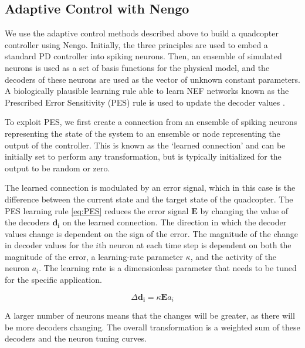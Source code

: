 \documentclass[letterpaper, 10 pt, conference]{ieeeconf}  %
\begin{document}
\subsection{Adaptive Control with Nengo}

We use the adaptive control methods described above to build a quadcopter controller using Nengo.
Initially, the three principles are used to embed a standard PD controller into spiking neurons.
Then, an ensemble of simulated neurons is used as a set of basis functions for the physical model, and the decoders of these neurons are used as the vector of unknown constant parameters.
A biologically plausible learning rule able to learn NEF networks known as the Prescribed Error Sensitivity (PES) rule is used to update the decoder values \cite{bekolay2013simultaneous}. 

To exploit PES, we first create a connection from an ensemble of spiking neurons representing the state of the system to an ensemble or node representing the output of the controller. 
This is known as the `learned connection' and can be initially set to perform any transformation, but is typically initialized for the output to be random or zero.

The learned connection is modulated by an error signal, which in this case is the difference between the current state and the target state of the quadcopter.
The PES learning rule \eqref{eq:PES} reduces the error signal $\bm{E}$ by changing the value of the decoders $\bm{d_{i}}$ on the learned connection. 
The direction in which the decoder values change is dependent on the sign of the error. 
The magnitude of the change in decoder values for the $i$th neuron at each time step is dependent on both the magnitude of the error, a learning-rate parameter $\kappa$, and the activity of the neuron $a_{i}$. 
The learning rate is a dimensionless parameter that needs to be tuned for the specific application. 

\begin{equation} \label{eq:PES}
\Delta \bm{d_{i}} = \kappa \bm{E} a_{i}
\end{equation}

A larger number of neurons means that the changes will be greater, as there will be more decoders changing. The overall transformation is a weighted sum of these decoders and the neuron tuning curves. 
\end{document}
